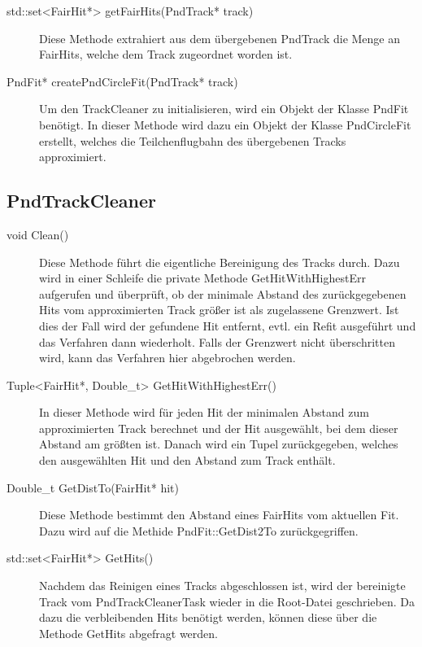 \begin{description}
	\item[std::set<FairHit*> getFairHits(PndTrack* track)] Diese Methode extrahiert aus dem übergebenen PndTrack die Menge an FairHits, welche dem Track zugeordnet worden ist.
	
	\item[PndFit* createPndCircleFit(PndTrack* track)] Um den TrackCleaner zu initialisieren, wird ein Objekt der Klasse PndFit benötigt. In dieser Methode wird dazu ein Objekt der Klasse PndCircleFit erstellt, welches die Teilchenflugbahn des übergebenen Tracks approximiert.
\end{description}

\subsection{PndTrackCleaner}
\begin{description}
	\item[void Clean()] Diese Methode führt die eigentliche Bereinigung des Tracks durch. Dazu wird in einer Schleife die private Methode GetHitWithHighestErr aufgerufen und überprüft, ob der minimale Abstand des zurückgegebenen Hits vom approximierten Track größer ist als zugelassene Grenzwert. Ist dies der Fall wird der gefundene Hit entfernt, evtl. ein Refit ausgeführt und das Verfahren dann wiederholt. Falls der Grenzwert nicht überschritten wird, kann das Verfahren hier abgebrochen werden.
	
	\item[Tuple<FairHit*, Double\_t> GetHitWithHighestErr()] In dieser Methode wird für jeden Hit der minimalen Abstand zum approximierten Track berechnet und der Hit ausgewählt, bei dem dieser Abstand am größten ist. Danach wird ein Tupel zurückgegeben, welches den ausgewählten Hit und den Abstand zum Track enthält.
	
	\item[Double\_t GetDistTo(FairHit* hit)] Diese Methode bestimmt den Abstand eines FairHits vom aktuellen Fit. Dazu wird auf die Methide PndFit::GetDist2To zurückgegriffen.
	
	\item[std::set<FairHit*> GetHits()] Nachdem das Reinigen eines Tracks abgeschlossen ist, wird der bereinigte Track vom PndTrackCleanerTask wieder in die Root-Datei geschrieben. Da dazu die verbleibenden Hits benötigt werden, können diese über die Methode GetHits abgefragt werden.
\end{description}

